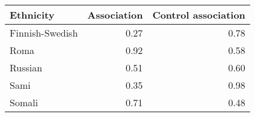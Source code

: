 \begin{tabular}{lrr}
\toprule
      Ethnicity &  Association &  Control association \\
\midrule
Finnish-Swedish &         0.27 &                 0.78 \\
           Roma &         0.92 &                 0.58 \\
        Russian &         0.51 &                 0.60 \\
           Sami &         0.35 &                 0.98 \\
         Somali &         0.71 &                 0.48 \\
\bottomrule
\end{tabular}
